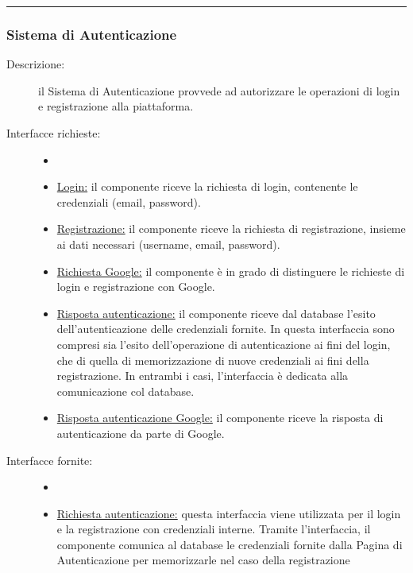 \documentclass[11pt, a4paper]{article}
\theoremstyle{definition} %
\begin{document}
\begin{center}
    \rule{5cm}{1pt}
\end{center}

\subsubsection{Sistema di Autenticazione}
\begin{description}
    \item[Descrizione:] il Sistema di Autenticazione provvede ad
    autorizzare le operazioni di login e registrazione alla piattaforma.

    \item[Interfacce richieste:]
    \begin{itemize}
        \item[]

        \item \underline{Login:} il componente riceve la richiesta di
        login, contenente le credenziali (email, password).

        \item \underline{Registrazione:} il componente riceve la richiesta
        di registrazione, insieme ai dati necessari (username, email, password).

        \item \underline{Richiesta Google:} il componente è in grado di
        distinguere le richieste di login e registrazione con Google.

        \item \underline{Risposta autenticazione:} il componente riceve
        dal database l'esito dell'autenticazione delle credenziali fornite.
        In questa interfaccia sono compresi sia l'esito dell'operazione di
        autenticazione ai fini del login, che di quella di memorizzazione
        di nuove credenziali ai fini della registrazione. In entrambi i casi,
        l'interfaccia è dedicata alla comunicazione col database.

        \item \underline{Risposta autenticazione Google:} il componente
        riceve la risposta di autenticazione da parte di Google.
    \end{itemize}

    \item[Interfacce fornite:]
    \begin{itemize}
        \item[]

        \item \underline{Richiesta autenticazione:} questa interfaccia viene
        utilizzata per il login e la registrazione con credenziali interne.
        Tramite l'interfaccia, il componente comunica al database le
        credenziali fornite dalla Pagina di Autenticazione per memorizzarle
        nel caso della registrazione


\end{itemize}
\end{description}
\end{document}

